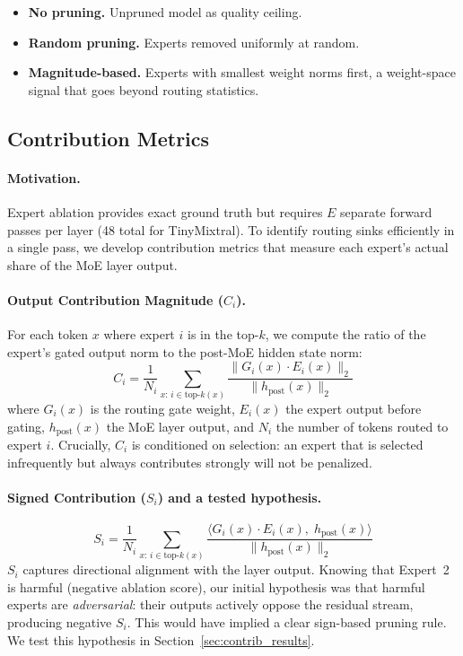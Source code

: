 \documentclass{article}
\begin{document}
\begin{itemize}
\item \textbf{No pruning.} Unpruned model as quality ceiling.
\item \textbf{Random pruning.} Experts removed uniformly at random.
\item \textbf{Magnitude-based.} Experts with smallest weight norms first, a weight-space signal that goes beyond routing statistics.
\end{itemize}

\subsection{Contribution Metrics}
\label{sec:contribution}

\paragraph{Motivation.}
Expert ablation provides exact ground truth but requires $E$ separate forward passes per layer (48 total for TinyMixtral). To identify routing sinks efficiently in a single pass, we develop contribution metrics that measure each expert's actual share of the MoE layer output.

\paragraph{Output Contribution Magnitude ($C_i$).}
For each token $x$ where expert $i$ is in the top-$k$, we compute the ratio of the expert's gated output norm to the post-MoE hidden state norm:
\begin{equation}
C_i = \frac{1}{N_i} \sum_{x:\, i \in \text{top-}k(x)} \frac{\|G_i(x) \cdot E_i(x)\|_2}{\|h_{\text{post}}(x)\|_2}
\label{eq:ci}
\end{equation}
where $G_i(x)$ is the routing gate weight, $E_i(x)$ the expert output before gating, $h_{\text{post}}(x)$ the MoE layer output, and $N_i$ the number of tokens routed to expert $i$. Crucially, $C_i$ is conditioned on selection: an expert that is selected infrequently but always contributes strongly will not be penalized.

\paragraph{Signed Contribution ($S_i$) and a tested hypothesis.}
\begin{equation}
S_i = \frac{1}{N_i} \sum_{x:\, i \in \text{top-}k(x)} \frac{\langle G_i(x) \cdot E_i(x),\; h_{\text{post}}(x) \rangle}{\|h_{\text{post}}(x)\|_2}
\label{eq:si}
\end{equation}
$S_i$ captures directional alignment with the layer output. Knowing that Expert~2 is harmful (negative ablation score), our initial hypothesis was that harmful experts are \emph{adversarial}: their outputs actively oppose the residual stream, producing negative $S_i$. This would have implied a clear sign-based pruning rule. We test this hypothesis in Section~\ref{sec:contrib_results}.
\end{document}
